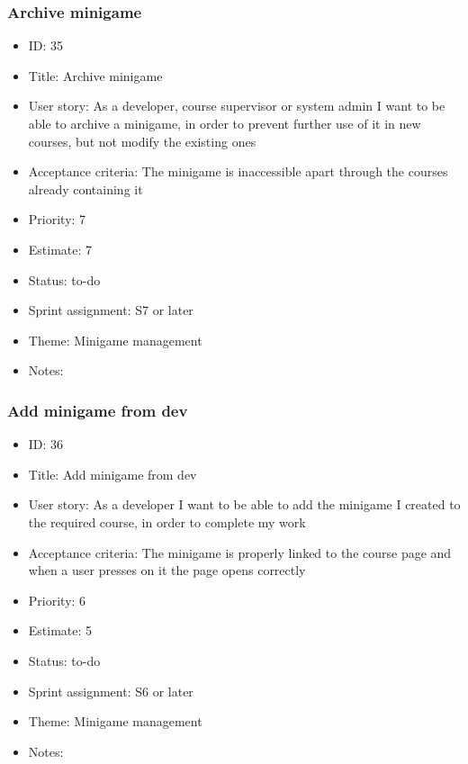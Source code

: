 \subsubsection{Archive minigame}
\begin{itemize}
	\item ID: 35
	\item Title: Archive minigame
	\item User story: As a developer, course supervisor or system admin I want to be able to archive a minigame, in order to prevent further use of it in new courses, but not modify the existing ones
	\item Acceptance criteria: The minigame is inaccessible apart through the courses already containing it 
	\item Priority: 7
	\item Estimate: 7
	\item Status: to-do
	\item Sprint assignment: S7 or later
	\item Theme: Minigame management
	\item Notes:
\end{itemize}

\subsubsection{Add minigame from dev}
\begin{itemize}
	\item ID: 36
	\item Title: Add minigame from dev
	\item User story: As a developer I want to be able to add the minigame I created to the required course, in order to complete my work
	\item Acceptance criteria: The minigame is properly linked to the course page and when a user presses on it the page opens correctly
	\item Priority: 6
	\item Estimate: 5
	\item Status: to-do
	\item Sprint assignment: S6 or later
	\item Theme: Minigame management
	\item Notes:
\end{itemize}

